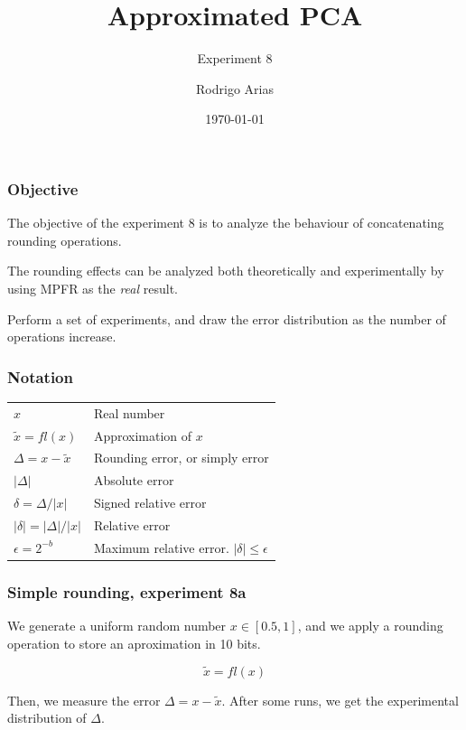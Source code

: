 \documentclass[serif, 12pt]{beamer}
\title{Approximated PCA}
\subtitle{Experiment 8}
\author{Rodrigo Arias} %
\date{\today} %
\begin{document}
\begin{frame}
	\titlepage
\end{frame}


\begin{frame}

\frametitle{Objective}

The objective of the experiment 8 is to analyze the behaviour of concatenating 
rounding operations.

\vspace{1em}
The rounding effects can be analyzed both theoretically and experimentally by 
using MPFR as the \textsl{real} result.

\vspace{1em}
Perform a set of experiments, and draw the error distribution as the number of 
operations increase.

\end{frame}


\begin{frame}

\frametitle{Notation}
\begin{center}
\begin{tabular}{l  l}
$x$ 											& Real number \\
$\tilde x = fl(x)$		 		& Approximation of $x$ \vspace{1em} \\
$\Delta = x-\tilde{x}$ 		& Rounding error, or simply error \\
$|\Delta|$								& Absolute error \vspace{1em} \\
$\delta = \Delta / |x|$		& Signed relative error \\
$|\delta| = |\Delta|/|x|$	& Relative error \vspace{1em} \\
$\epsilon = 2^{-b}$				& Maximum relative error. $|\delta| \le \epsilon$ \\
\end{tabular}
\end{center}

\end{frame}

\begin{frame}

\frametitle{Simple rounding, experiment 8a}

We generate a uniform random number $x \in [0.5, 1]$, and we apply a rounding 
operation to store an aproximation in 10 bits.

$$ \tilde{x} = fl(x) $$

Then, we measure the error $\Delta = x - \tilde x$. After some runs, we get the 
experimental distribution of $\Delta$.

\end{frame}
\end{document}
